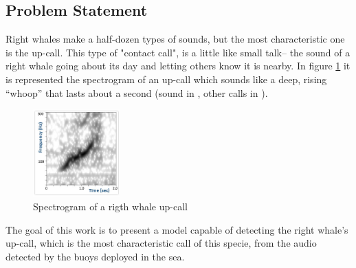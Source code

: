 \documentclass[]{article}
\begin{document}
\subsection{Problem Statement}\label{problem-statement}

Right whales make a half-dozen types of sounds, but the most characteristic one is the up-call. This type of "contact call",  is a little like small talk-- the sound of a right whale going about its day and letting others know it is nearby. In figure \ref{img:upcall} it is represented the spectrogram of an up-call which sounds like a deep, rising “whoop” that lasts about a second (sound in \cite{CornellWeb}, other calls in \cite{CornellWeb2}).

\begin{figure}[htpb!]
\centering
\includegraphics[width= 0.3\textwidth]{images/sound_upcall_quiet.jpg}
\caption{Spectrogram of a rigth whale up-call \cite{CornellWeb} \label{img:upcall}}
\end{figure}
The goal of this work is to present a model capable of detecting the right whale's up-call, which is the most characteristic call of this specie, from the audio detected by the buoys deployed in the sea.
\end{document}
